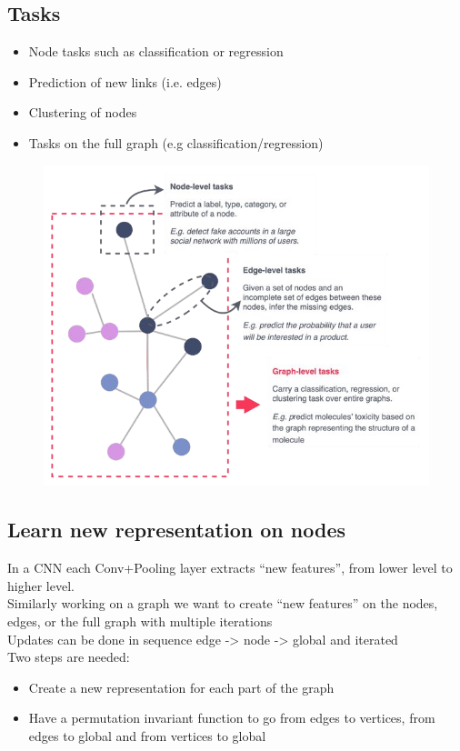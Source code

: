 \subsection{Tasks}

\begin{itemize}
	\item Node tasks such as
	classification or regression
	\item Prediction of new links (i.e.
	edges)
	\item Clustering of nodes 
	\item Tasks on the full graph (e.g classification/regression)
\end{itemize}

\begin{figure}[ht]
	\centering
	\includegraphics[width=0.6\linewidth]{figure_ml/tasks}
\end{figure}
\FloatBarrier
\subsection{Learn new representation on nodes}

In a CNN each Conv+Pooling layer extracts “new features”, from lower level to higher level.\\

Similarly working on a graph we want to create “new features” on the nodes,
edges, or the full graph with multiple iterations\\

Updates can be done in sequence edge -> node -> global and iterated\\

Two steps are needed:
\begin{itemize}
	\item Create a new representation for each part of the graph 
	\item Have a permutation invariant function to go from edges to vertices, from edges to global and
	from vertices to global
\end{itemize}


